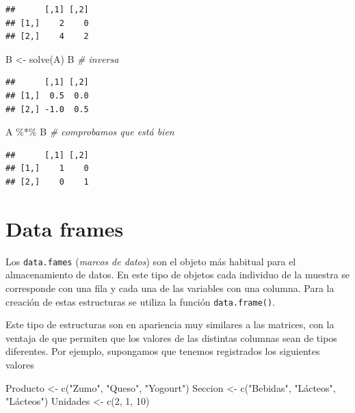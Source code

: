 \documentclass[
]{book}
\newenvironment{Shaded}{\begin{snugshade}}{\end{snugshade}}
\newcommand{\CommentTok}[1]{\textcolor[rgb]{0.56,0.35,0.01}{\textit{#1}}}
\newcommand{\DecValTok}[1]{\textcolor[rgb]{0.00,0.00,0.81}{#1}}
\newcommand{\FunctionTok}[1]{\textcolor[rgb]{0.00,0.00,0.00}{#1}}
\newcommand{\NormalTok}[1]{#1}
\newcommand{\OtherTok}[1]{\textcolor[rgb]{0.56,0.35,0.01}{#1}}
\newcommand{\SpecialCharTok}[1]{\textcolor[rgb]{0.00,0.00,0.00}{#1}}
\newcommand{\StringTok}[1]{\textcolor[rgb]{0.31,0.60,0.02}{#1}}
\theoremstyle{break}
\begin{document}
\begin{verbatim}
##      [,1] [,2]
## [1,]    2    0
## [2,]    4    2
\end{verbatim}

\begin{Shaded}
\begin{Highlighting}[]
\NormalTok{B }\OtherTok{\textless{}{-}} \FunctionTok{solve}\NormalTok{(A)}
\NormalTok{B  }\CommentTok{\# inversa}
\end{Highlighting}
\end{Shaded}

\begin{verbatim}
##      [,1] [,2]
## [1,]  0.5  0.0
## [2,] -1.0  0.5
\end{verbatim}

\begin{Shaded}
\begin{Highlighting}[]
\NormalTok{A }\SpecialCharTok{\%*\%}\NormalTok{ B  }\CommentTok{\# comprobamos que está bien}
\end{Highlighting}
\end{Shaded}

\begin{verbatim}
##      [,1] [,2]
## [1,]    1    0
## [2,]    0    1
\end{verbatim}

\hypertarget{data-frames}{%
\section{Data frames}\label{data-frames}}

Los \texttt{data.fames} (\emph{marcos de datos}) son el objeto más habitual para el
almacenamiento de datos. En este tipo de objetos cada individuo de la muestra
se corresponde con una fila y cada una de las variables con una columna.
Para la creación de estas estructuras se utiliza la función
\texttt{data.frame()}.

Este tipo de estructuras son en apariencia muy similares a las matrices, con la
ventaja de que permiten que los valores de las distintas columnas sean de tipos
diferentes. Por ejemplo, supongamos que tenemos registrados los siguientes valores

\begin{Shaded}
\begin{Highlighting}[]
\NormalTok{Producto }\OtherTok{\textless{}{-}} \FunctionTok{c}\NormalTok{(}\StringTok{"Zumo"}\NormalTok{, }\StringTok{"Queso"}\NormalTok{, }\StringTok{"Yogourt"}\NormalTok{)}
\NormalTok{Seccion }\OtherTok{\textless{}{-}} \FunctionTok{c}\NormalTok{(}\StringTok{"Bebidas"}\NormalTok{, }\StringTok{"Lácteos"}\NormalTok{, }\StringTok{"Lácteos"}\NormalTok{)}
\NormalTok{Unidades }\OtherTok{\textless{}{-}} \FunctionTok{c}\NormalTok{(}\DecValTok{2}\NormalTok{, }\DecValTok{1}\NormalTok{, }\DecValTok{10}\NormalTok{)}
\end{Highlighting}
\end{Shaded}
\end{document}

